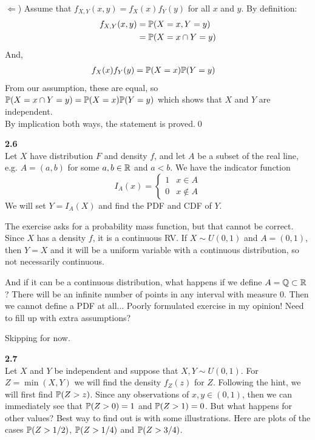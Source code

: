 \medskip\noindent
$\Leftarrow$) Assume that $f_{X,Y}(x, y) = f_X(x)f_Y(y)$ for all $x$ and $y$.
By definition:
\begin{align*}
    f_{X,Y}(x, y) &= \P(X=x, Y=y) \\
    &= \P(X=x\cap Y=y)
\end{align*}
And,
\begin{align*}
    f_X(x)f_Y(y) &= \P(X=x)\P(Y=y)
\end{align*}
From our assumption, these are equal, so $\P(X=x\cap Y=y) = \P(X=x)\P(Y=y)$ which shows that
$X$ and $Y$ are independent.\\
By implication both ways, the statement is proved.\qed

\bigskip\noindent
\textbf{2.6}\\  %
Let $X$ have distribution $F$ and density $f$, and let $A$ be a subset of the
real line, e.g. $A = (a,b)$ for some $a,b\in\R$ and $a<b$. We have the indicator function
$$
I_A(x) =
\left\{
    \begin{matrix}
        1 & x\in A \\
        0 & x\not\in A
    \end{matrix}
\right.
$$
We will set $Y = I_A(X)$ and find the PDF and CDF of $Y$. 

\medskip\noindent
The exercise asks for a
probability mass function, but that cannot be correct. Since $X$ has a density $f$, it is
a continuous RV. If $X\sim U(0,1)$ and $A = (0,1)$, then $Y = X$ and it will be a uniform
variable with a continuous distribution, so not necessarily continuous.

\medskip\noindent
And if it can be a continuous distribution, what happens if we define $A = \mathbb{Q}\subset\R$?
There will be an infinite number of points in any interval with measure 0. Then we cannot define
a PDF at all... Poorly formulated exercise in my opinion! Need to fill up with 
extra assumptions? 

\medskip\noindent
Skipping for now.

\newpage\noindent
\textbf{2.7}\\  %
Let $X$ and $Y$ be independent and suppose that $X,Y\sim U(0,1)$.
For $Z = \min(X, Y)$ we will find the density $f_Z(z)$ for $Z$. Following the hint, we will first
find $\P(Z > z)$. Since any observations of $x,y\in(0,1)$, then we can immediately see that
$\P(Z > 0) = 1$ and $\P(Z > 1) = 0$. But what happens for other values? Best way to find out is
with some illustrations. Here are plots of the cases $\P(Z > 1/2)$, $\P(Z > 1/4)$ and $\P(Z > 3/4)$.

